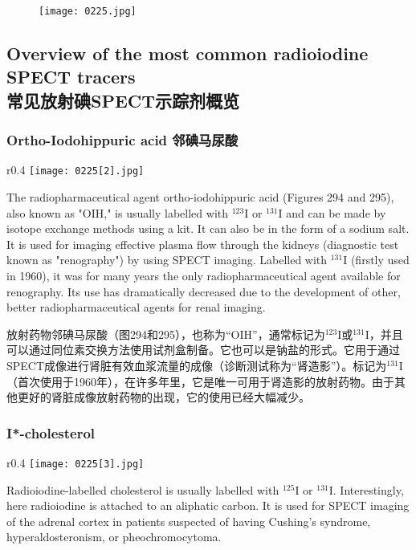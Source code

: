 \documentclass[dvipsnames, svgnames,a4paper,11pt]{article}
\begin{document}
\begin{figure}[h]
	\centering
    \texttt{[image: 0225.jpg]}  
     \label{fig294}
\end{figure}

\subsection{Overview of the most common radioiodine SPECT tracers\\ 常见放射碘SPECT示踪剂概览}  
\subsubsection{Ortho-Iodohippuric acid 邻碘马尿酸}  


\begin{wrapfigure}{r}{0.4\textwidth}
    \centering
    \texttt{[image: 0225[2].jpg]}
     \label{fig295}
\end{wrapfigure}

The radiopharmaceutical agent ortho-iodohippuric acid (Figures 294 and 295), also known as "OIH," is usually labelled with \(\mathrm{^{123}I}\) or \(\mathrm{^{131}I}\) and can be made by isotope exchange methods using a kit. It can also be in the form of a sodium salt. It is used for imaging effective plasma flow through the kidneys (diagnostic test known as "renography") by using SPECT imaging. Labelled with \(\mathrm{^{131}I}\) (firstly used in 1960), it was for many years the only radiopharmaceutical agent available for renography. Its use has dramatically decreased due to the development of other, better radiopharmaceutical agents for renal imaging.

放射药物邻碘马尿酸（图294和295），也称为“OIH”，通常标记为\(\mathrm{^{123}I}\)或\(\mathrm{^{131}I}\)，并且可以通过同位素交换方法使用试剂盒制备。它也可以是钠盐的形式。它用于通过SPECT成像进行肾脏有效血浆流量的成像（诊断测试称为“肾造影”）。标记为\(\mathrm{^{131}I}\)（首次使用于1960年），在许多年里，它是唯一可用于肾造影的放射药物。由于其他更好的肾脏成像放射药物的出现，它的使用已经大幅减少。

\subsubsection{I*-cholesterol}  

\begin{wrapfigure}{r}{0.4\textwidth}
    \centering
    \texttt{[image: 0225[3].jpg]}
     \label{fig296}
\end{wrapfigure}
Radioiodine-labelled cholesterol is usually labelled with \(\mathrm{^{125}I}\) or \(\mathrm{^{131}I}\). Interestingly, here radioiodine is attached to an aliphatic carbon. It is used for SPECT imaging of the adrenal cortex in patients suspected of having Cushing's syndrome, hyperaldosteronism, or pheochromocytoma.
\end{document}
